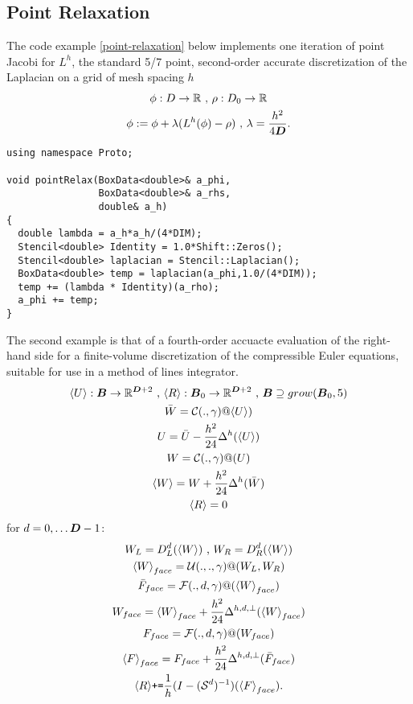 \documentclass[12pt]{article}
\newcommand{\av}[1]{{\langle #1 \rangle}}
\begin{document}
\subsection{Point Relaxation}
The code example \ref{point-relaxation} below implements one iteration of point Jacobi for $L^h$, the standard 5/7 point, second-order accurate discretization of the Laplacian on a grid of mesh spacing $h$
\begin{gather*}
\phi:D \rightarrow \mathbb{R} \hbox{ , } \rho : D_0 \rightarrow \mathbb{R} \\
\phi := \phi + \lambda (L^h(\phi) - \rho) \hbox{ , } \lambda = \frac{h^2}{4 {\boldsymbol{D}}}.
\end{gather*}
\begin{lstlisting}[label=point-relaxation , caption=Point Jacobi Relaxation for Poisson]
using namespace Proto;

void pointRelax(BoxData<double>& a_phi,
                BoxData<double>& a_rhs,
                double& a_h)
{
  double lambda = a_h*a_h/(4*DIM);
  Stencil<double> Identity = 1.0*Shift::Zeros(); 
  Stencil<double> laplacian = Stencil::Laplacian();
  BoxData<double> temp = laplacian(a_phi,1.0/(4*DIM));
  temp += (lambda * Identity)(a_rho);
  a_phi += temp;
}
\end{lstlisting}
The second example is that of a fourth-order accuacte evaluation of the right-hand side for a finite-volume discretization of the compressible Euler equations, suitable for use in a method of lines integrator.
\begin{gather*}
\av{U}: \boldsymbol{B} \rightarrow \mathbb{R}^{\DIM+2} \hbox{ , } \av{R} : \boldsymbol{B}_0 \rightarrow \mathbb{R}^{\DIM + 2} \hbox{ , } \boldsymbol{B} \supseteq grow(\boldsymbol{B}_0, 5) \\
\bar{W} = \mathcal{C}(.,\gamma)@\av{U}) \\
U = \bar{U} - \frac{h^2}{24} \Delta^h(\av{U})\\
W  = \mathcal{C}(.,\gamma)@(U) \\
\av{W} = W + \frac{h^2}{24} \Delta^h(\bar{W}) \\
\av{R} = 0
\end{gather*}
for $d = 0 , \dots {\boldsymbol{D}}-1$:
\begin{gather*}
W_L = D_L^d(\av{W}) \hbox{ , } W_R = D_R^d (\av{W}) \\
\av{W}_{face} = \mathcal{U}(.,.,\gamma)@(W_L,W_R) \\
\bar{F}_{face} = \mathcal{F}(.,d,\gamma)@(\av{W}_{face}) \\
W_{face} = \av{W}_{face} + \frac{h^2}{24} \Delta^{h,d,\perp}(\av{W}_{face}) \\
F_{face} = \mathcal{F}(.,d,\gamma)@({W}_{face}) \\
\av{F}_{face} = F_{face} + \frac{h^2}{24}\Delta^{h,d,\perp} (\bar{F}_{face}) \\
\av{R} \hbox{\tt +=}\frac{1}{h}(I - (\mathcal{S}^d)^{-1})(\av{F}_{face}).
\end{gather*}
\end{document}

